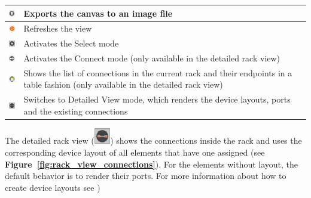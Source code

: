 \documentclass[a4paper]{article}
\begin{document}
		\begin{table}[h!]
			\centering
			\begin{tabular}[h!]{lp{10cm}}
				\includegraphics[width=0.5cm]{img/rack_view_export.png} & Exports the canvas to an image file\\
				\midrule
				\includegraphics[width=0.5cm]{img/rack_view_refresh.png} & Refreshes the view\\
				\midrule
				\includegraphics[width=0.5cm]{img/rack_view_select.png} & Activates the Select mode\\
				\midrule
				\includegraphics[width=0.5cm]{img/rack_view_connect_ports.png} & Activates the Connect mode (only available in the detailed rack view)\\
				\midrule
				\includegraphics[width=0.5cm]{img/rack_view_table.png} & Shows the list of connections in the current rack and their endpoints in a table fashion (only available in the detailed rack view)\\
				\midrule
				\includegraphics[width=0.5cm]{img/rack_view_show_connections.png} & Switches to Detailed View mode, which renders the device layouts, ports and the existing connections\\
				\midrule
			\end{tabular}
		\end{table}
		\newpage
		The detailed rack view (\includegraphics[width=0.7cm]{img/rack_view_show_connections.png}) shows the connections inside the rack  and uses the corresponding device layout of all elements that have one assigned (see  \textbf{Figure~\ref{fig:rack_view_connections}}). For the elements without layout, the default behavior is to render their ports.  For more information about how to create device layouts see \textbf{})
		
\end{document}
